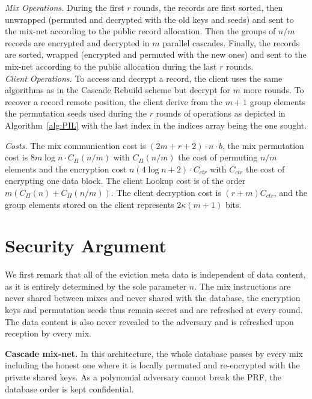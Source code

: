 \documentclass{llncs}
\begin{document}
\noindent\textit{Mix Operations.} During the first $r$ rounds, the records are first sorted, then  unwrapped (permuted and decrypted with the old keys and seeds) and sent to the mix-net according to the public record allocation. Then the groups of $n/m$ records are encrypted and decrypted in $m$ parallel cascades. Finally, the records are sorted, wrapped (encrypted and permuted with the new ones) and sent to the mix-net according to the public allocation during the last $r$ rounds.\\

\noindent\textit{Client Operations.} To access and decrypt a record, the client uses the same algorithms as in the Cascade Rebuild scheme but decrypt for $m$ more rounds.  To recover a record remote position, the client derive from the $m+1$ group elements the permutation seeds used during the $r$ rounds of operations as depicted in Algorithm~\ref{alg:PIL} with the last index in the indices array being the one sought.

\noindent\textit{Costs.} The mix communication cost is $ (2m+r+2) \cdot n \cdot b$, the mix permutation cost is $8m \log n \cdot C_{\Pi}(n/m)$ with $C_{\Pi}(n/m)$ the cost of permuting $n/m$ elements and the encryption cost $n (4 \log n +2) \cdot C_{ctr}$ with $C_{ctr}$ the cost of encrypting one data block. The client Lookup cost is of the order $m (C_{\Pi}(n)+C_{\Pi}(n/m))$. The client decryption cost is $(r+m) C_{ctr}$, and the group elements stored on the client represents $2\kappa (m+1)$ bits.

\section{Security Argument}\label{Security}

We first remark that all of the eviction meta data is independent of data content, as it is entirely determined by the sole parameter $n$. The mix instructions are never shared between mixes and never shared with the database, the encryption keys and permutation seeds thus remain secret and are refreshed at every round. The data content is also never revealed to the adversary and is refreshed upon reception by every mix.

\noindent\textbf{Cascade mix-net.}
In this architecture, the whole database passes by every mix including the honest one where it is locally permuted and re-encrypted with the private shared keys. As a polynomial adversary cannot break the PRF, the database order is kept confidential.\\
\end{document}
